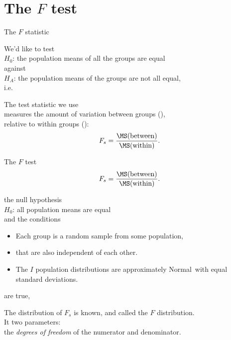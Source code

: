 \section{The $F$ test}

\begin{frame}{The $F$ statistic}

  We'd like to test\\
    \hspace{2em} $H_0$: the population means of all the groups are equal \\
  against \\
    \hspace{2em} $H_A$: the population means of the groups are not all equal, \\
  i.e.\ 

  \vspace{2em}

    The \alert{test statistic} we use \\
    measures the amount of variation between groups (), \\
    relative to within groups ():
    \[
        F_s = \frac{ \MS(\text{between}) }{ \MS(\text{within}) } .
    \]

\end{frame}

\begin{frame}{The $F$ test}
    \[
        F_s = \frac{ \MS(\text{between}) }{ \MS(\text{within}) } .
    \]
    \vspace{2em}

     the null hypothesis\\
    \hspace{3em} $H_0$: all population means are equal \\
    and the conditions
    \begin{itemize}
      \item Each group is a random sample from some population,
      \item that are also independent of each other.
      \item The $I$ population distributions are approximately Normal\
        with equal standard deviations.
    \end{itemize}
    are true, 

    \vspace{2em}

    The distribution of $F_s$ is known, and called 
    the \alert{$F$ distribution}. \\
    It  two parameters: \\
    the \emph{degrees of freedom} of the numerator and denominator.


\end{frame}


